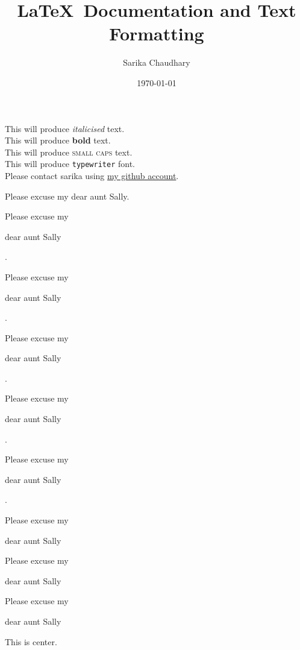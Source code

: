 \documentclass[12pt]{article}
\title{\LaTeX\ Documentation and Text Formatting}
\author{Sarika Chaudhary}
\date{\today}
\begin{document}
\tableofcontents
\maketitle



This will produce \textit{italicised} text. \\
This will produce \textbf{bold} text. \\
This will produce \textsc{small caps} text.\\
This will produce \texttt{typewriter} font.\\
Please contact sarika using \href{https://github.com/sarika-chaudhary}{my github account}.

\vspace{1cm}

Please excuse my dear aunt Sally.

Please excuse my \begin{large}dear aunt Sally
\end{large}.

Please excuse my \begin{Large}dear aunt Sally
\end{Large}.

Please excuse my \begin{LARGE} dear aunt Sally
\end{LARGE}.

Please excuse my \begin{huge} dear aunt Sally
\end{huge}.

Please excuse my \begin{Huge} dear aunt Sally
\end{Huge} .

Please excuse my \begin{small}dear aunt Sally \end{small} 

Please excuse my \begin{scriptsize}dear aunt Sally \end{scriptsize} 

Please excuse my \begin{tiny}dear aunt Sally \end{tiny} 


\vspace{1cm}

\begin{center}
This is center.
\end{center}
\end{document}
